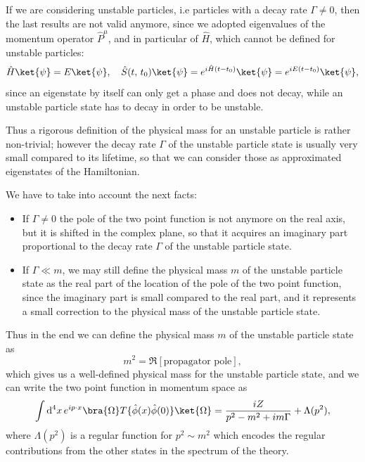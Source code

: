 \begin{example}
    If we are considering unstable particles, i.e particles with a decay rate \(\Gamma \neq 0\), then the last results are not valid anymore, since we adopted eigenvalues of the momentum operator \(\hat{P}^\mu\), and in particular of \(\hat{H}\), which cannot be defined for unstable particles:
    \[
        \hat{H} \ket{\psi} = E \ket{\psi}, \quad \hat{S}(t,\,t_0) \ket{\psi} = e^{i \hat{H} (t-t_0)} \ket{\psi} = e^{i E (t-t_0)} \ket{\psi},
    \]
    since an eigenstate by itself can only get a phase and does not decay, while an unstable particle state has to decay in order to be unstable.

    Thus a rigorous definition of the physical mass for an unstable particle is rather non-trivial; however the decay rate \(\Gamma\) of the unstable particle state is usually very small compared to its lifetime, so that we can consider those as approximated eigenstates of the Hamiltonian.

    We have to take into account the next facts:
    \begin{itemize}
        \item If \(\Gamma \neq 0\) the pole of the two point function is not anymore on the real axis, but it is shifted in the complex plane, so that it acquires an imaginary part proportional to the decay rate \(\Gamma\) of the unstable particle state.
        \item If \(\Gamma \ll m\), we may still define the physical mass \(m\) of the unstable particle state as the real part of the location of the pole of the two point function, since the imaginary part is small compared to the real part, and it represents a small correction to the physical mass of the unstable particle state.
    \end{itemize}
    Thus in the end we can define the physical mass \(m\) of the unstable particle state as
    \[
        m^2 = \Re\left[ \text{propagator pole} \right],
    \]
    which gives us a well-defined physical mass for the unstable particle state, and we can write the two point function in momentum space as
    \[
        \int \mathrm{d}^4 x \, e^{ip \cdot x} \bra{\Omega} T \{ \hat{\phi}(x) \hat{\phi}(0) \} \ket{\Omega} = \frac{iZ}{p^2 - m^2 + i m \Gamma} + \Lambda(p^2),
    \]
    where \(\Lambda(p^2)\) is a regular function for \(p^2 \sim m^2\) which encodes the regular contributions from the other states in the spectrum of the theory.
\end{example}

